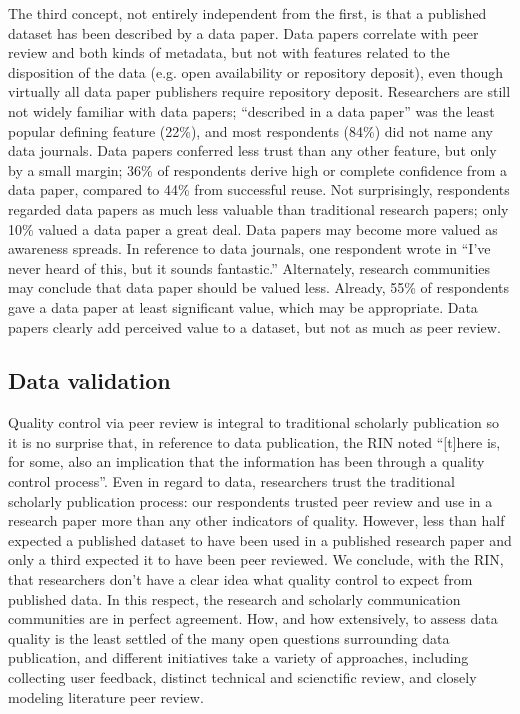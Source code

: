 \documentclass[10pt]{article}
\begin{document}
The third concept, not entirely independent from the first, is that a published dataset has been described by a data paper.
Data papers correlate with peer review and both kinds of metadata, but not with features related to the disposition of the data (e.g. open availability or repository deposit), even though virtually all data paper publishers require repository deposit.
Researchers are still not widely familiar with data papers; ``described in a data paper'' was the least popular defining feature (22\%), and most respondents (84\%) did not name any data journals.
Data papers conferred less trust than any other feature, but only by a small margin; 36\% of respondents derive high or complete confidence from a data paper, compared to 44\% from successful reuse.
Not surprisingly, respondents regarded data papers as much less valuable than traditional research papers; only 10\% valued a data paper a great deal. %
Data papers may become more valued as awareness spreads.
In reference to data journals, one respondent wrote in ``I've never heard of this, but it sounds fantastic.''
Alternately, research communities may conclude that data paper should be valued less.
Already, 55\% of respondents gave a data paper at least significant value, which may be appropriate.
Data papers clearly add perceived value to a dataset, but not as much as peer review.
 
\subsection*{Data validation}

Quality control via peer review is integral to traditional scholarly publication so it is no surprise that, in reference to data publication, the RIN noted ``[t]here is, for some, also an implication that the information has been through a quality control process''\cite{swan_share_2008}.
Even in regard to data, researchers trust the traditional scholarly publication process: our respondents trusted peer review and use in a research paper more than any other indicators of quality.
However, less than half expected a published dataset to have been used in a published research paper and only a third expected it to have been peer reviewed.
We conclude, with the RIN, that researchers don't have a clear idea what quality control to expect from published data.
In this respect, the research and scholarly communication communities are in perfect agreement.
How, and how extensively, to assess data quality is the least settled of the many open questions surrounding data publication, and different initiatives take a variety of approaches, including collecting user feedback, distinct technical and scienctific review, and closely modeling literature peer review\cite{kratz_data_2014}.
\end{document}
